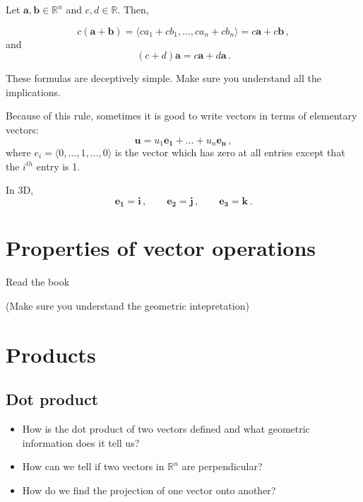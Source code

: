 \documentclass[
]{book}
\theoremstyle{definition}
\theoremstyle{definition}
\theoremstyle{definition}
\theoremstyle{definition}
\theoremstyle{remark}
\begin{document}
Let \(\textbf{a}, \textbf{b} \in \mathbb{R}^n\) and \(c,d \in \mathbb{R}\). Then,

\begin{equation*}
    c( \textbf{a} + \textbf{b}) = \langle c a_1 + c b_1, \dots, c a_n + c b_n \rangle  
    = c\textbf{a} + c\textbf{b} \,,
\end{equation*}
and
\begin{equation*}
 (c+d) \textbf{a} = c\mathbf{a} + d\mathbf{a} \,.
\end{equation*}

These formulas are deceptively simple. Make sure you understand all the implications.

Because of this rule, sometimes it is good to write vectors in terms of elementary vectors:
\begin{equation*}
    \mathbf{u} = u_1 \mathbf{e_1} + \dots + u_n \mathbf{e_n} \,,
\end{equation*}
where
\(e_i = \langle 0,\dots, 1, \dots, 0\rangle\) is the vector which has zero at all entries
except that the \(i^{th}\) entry is 1.

In 3D,
\begin{equation*}
    \mathbf{e_1} = \mathbf{i} \,, \qquad 
    \mathbf{e_2} = \mathbf{j} \,, \qquad
    \mathbf{e_3} = \mathbf{k} \,.
\end{equation*}

\section*{Properties of vector operations}\label{properties-of-vector-operations}


Read the book

(Make sure you understand the geometric intepretation)

\section{Products}\label{products}

\subsection{Dot product}\label{dot-product}

\begin{itemize}
\item
  How is the dot product of two vectors defined and what geometric information does it tell us?
\item
  How can we tell if two vectors in \(\mathbb{R}^n\)
  are perpendicular?
\item
  How do we find the projection of one vector onto another?
\end{itemize}
\end{document}
